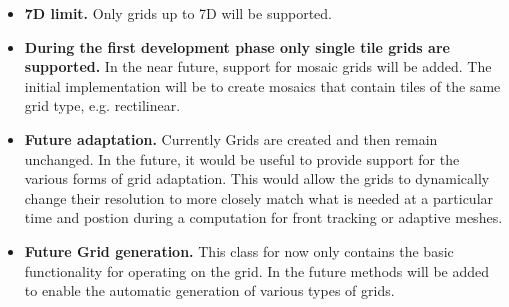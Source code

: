 

\begin{itemize}

\item {\bf 7D limit.}  Only grids up to 7D will be supported.

\item {\bf During the first development phase only single
tile grids are supported.}  In the near future, support
for mosaic grids will be added.  The initial implementation 
will be to create mosaics that contain tiles of the same
grid type, e.g. rectilinear.

\item {\bf Future adaptation.}  Currently Grids
are created and then remain unchanged. In the future, it would
be useful to provide support for the various forms of grid
adaptation. This would allow the grids to dynamically change
their resolution to more closely match what is needed at a particular
time and postion during a computation for front tracking or adaptive meshes.


\item {\bf Future Grid generation.} This class for now only contains
the basic functionality for operating on the grid. In the future
methods will be added to enable the automatic generation of various types of
grids. 


\end{itemize}

